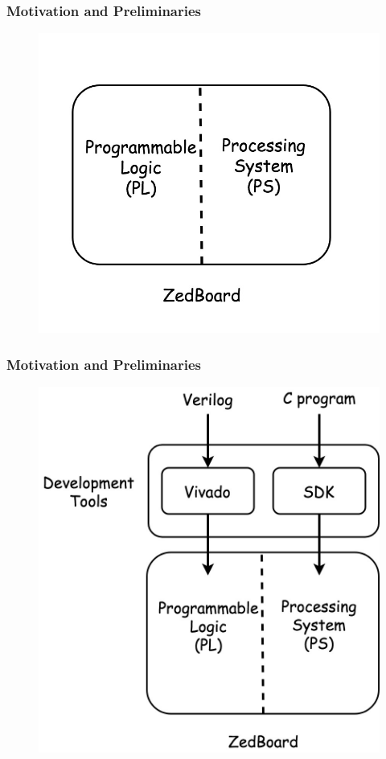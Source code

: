 \documentclass{beamer}
\begin{document}
\begin{frame}
\frametitle{\textcolor[rgb]{0.5,0.5,0.3}{Motivation} and Preliminaries}
\begin{figure}
\centering\includegraphics[scale=0.2]{image/why_linux.jpg}
\end{figure}
\end{frame}


\begin{frame}
\frametitle{\textcolor[rgb]{0.5,0.5,0.3}{Motivation} and Preliminaries}
\begin{figure}
\centering\includegraphics[scale=0.175]{image/why_linux2.jpg}
\end{figure}
\end{frame}
\end{document}
